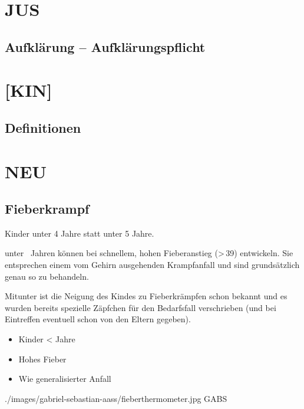 \documentclass[
ngerman,
paper=a4,
asymmetric,
fontsize=10pt,
draft=false,
numbers=noenddot,
bibtotocnumbered,
footnotes=multiple,
]{scrreprt}
\begin{document}
\section{JUS}
\subsection{Aufklärung -- Aufklärungspflicht}

\section{[KIN]}

\subsection{Definitionen}




\section{NEU}
\subsection{Fieberkrampf}
Kinder unter 4 Jahre statt unter 5 Jahre.

{%
\label{topic:fieberkrampf}%
%
%
%
 unter ~Jahren können bei schnellem, hohen
Fieberanstieg ({\textgreater}\,39{\DegC}) 
 entwickeln. Sie entsprechen einem vom
Gehirn ausgehenden Krampfanfall und sind grundsätzlich genau
so zu behandeln.

Mitunter ist die Neigung des Kindes zu Fieberkrämpfen schon
bekannt und es wurden bereits spezielle Zäpfchen für den
Bedarfsfall verschrieben (und bei Eintreffen eventuell schon
von den Eltern gegeben).
}{
\begin{itemize}
  \item Kinder {\textless}  Jahre
  \item Hohes Fieber
  \item Wie generalisierter Anfall
\end{itemize}
}
{./images/gabriel-sebastian-aass/fieberthermometer.jpg}
{}
{GABS}
\end{document}
